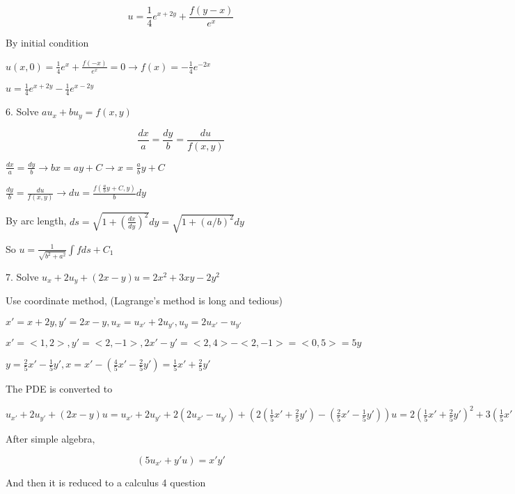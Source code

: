 \documentclass{article}
\begin{document}
$$ u = \frac{1}{4}e^{x+2y} + \frac{f(y-x)}{e^x}$$

By initial condition

$u(x,0) = \frac{1}{4}e^{x} + \frac{f(-x)}{e^x} = 0 \rightarrow f(x) = -\frac{1}{4}e^{-2x}$

$u = \frac{1}{4}e^{x+2y} - \frac{1}{4}e^{x-2y}$

6. Solve $au_x+bu_y = f(x,y)$

$$\frac{dx}{a} = \frac{dy}{b} = \frac{du}{f(x,y)}$$

$\frac{dx}{a} = \frac{dy}{b} \rightarrow bx = ay+C \rightarrow x = \frac{a}{b} y + C$

$\frac{dy}{b} = \frac{du}{f(x,y)} \rightarrow du  = \frac{f(\frac{a}{b} y + C,y)}{b} dy$

By arc length, $ds = \sqrt{1+(\frac{dx}{dy})^2} dy = \sqrt{1+(a/b)^2} dy$

So $u = \frac{1}{\sqrt{b^2+a^2}} \int f ds+C_1$

7. Solve $u_x+2u_y+(2x-y)u = 2x^2+3xy-2y^2$

Use coordinate method, (Lagrange's method is long and tedious)

$x' = x+2y,y'=2x-y,u_{x} = u_{x'}+2u_{y'},u_{y} = 2u_{x'}-u_{y'}$

$x' = <1,2>, y'=<2,-1>, 2x'-y'=<2,4>-<2,-1>=<0,5> = 5y$

$y = \frac{2}{5} x' - \frac{1}{5} y', x = x' - (\frac{4}{5} x' - \frac{2}{5} y') = \frac{1}{5} x' + \frac{2}{5} y'$

The PDE is converted to 

$u_{x'}+2u_{y'} +(2x-y)u = u_{x'}+2u_{y'}+ 2(2u_{x'}-u_{y'}) + (2(\frac{1}{5} x' + \frac{2}{5} y')-(\frac{2}{5} x' - \frac{1}{5} y'))u = 2(\frac{1}{5} x' + \frac{2}{5} y')^2+3(\frac{1}{5} x' + \frac{2}{5} y')(\frac{2}{5} x' - \frac{1}{5} y')-2(\frac{2}{5} x' - \frac{1}{5} y')^2 $

After simple algebra,

$$ (5u_{x'}+ y'u) = x'y'$$

And then it is reduced to a calculus 4 question
\end{document}
